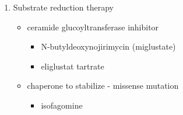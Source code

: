 \documentclass{scrartcl}
\begin{document}
\begin{enumerate}
\begin{enumerate}
\item Substrate reduction therapy
\label{sec:orge572753}
\begin{itemize}
\item ceramide glucoyltransferase inhibitor
\begin{itemize}
\item N-butyldeoxynojirimycin (miglustate)
\item eliglustat tartrate
\end{itemize}
\item chaperone to stabilize - missense mutation
\begin{itemize}
\item isofagomine
\end{itemize}
\end{itemize}
\end{enumerate}
\end{enumerate}
\end{document}
